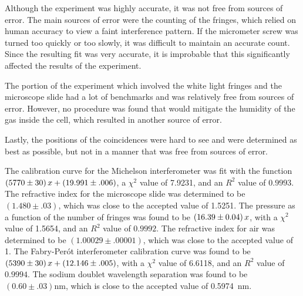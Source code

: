 \begin{paper}

	Although the experiment was highly accurate, it was not free from sources of error. The main sources of error were the counting of the fringes, which relied on human accuracy to view a faint interference pattern. If the micrometer screw was turned too quickly or too slowly, it was difficult to maintain an accurate count. Since the resulting fit was very accurate, it is improbable that this significantly affected the results of the experiment.
	
	The portion of the experiment which involved the white light fringes and the microscope slide had a lot of benchmarks and was relatively free from sources of error. However, no procedure was found that would mitigate the humidity of the gas inside the cell, which resulted in another source of error.
	
	Lastly, the positions of the coincidences were hard to see and were determined as best as possible, but not in a manner that was free from sources of error.
	
The calibration curve for the Michelson interferometer was fit with the function \( \left(5770 \pm 30 \right) x + \left(19.991 \pm .006\right) \), a $\chi^2$ value of 7.9231, and an \( R^2 \) value of \( 0.9993 \).
	The refractive index for the microscope slide was determined to be $(1.480\pm.03)$, which was close to the accepted value of 1.5251.
	The pressure as a function of the number of fringes was found to be \( \left(16.39 \pm 0.04\right) x \), with a $\chi^2$ value of 1.5654, and an \( R^2 \) value of \( 0.9992 \).
	The refractive index for air was determined to be $(1.00029\pm.00001)$, which was close to the accepted value of 1.
	The Fabry-Per\'ot interferometer calibration curve was found to be \( \left(5390 \pm 30\right) x + \left(12.146 \pm .005 \right) \), with a $\chi^2$ value of 6.6118, and an \( R^2 \) value of \( 0.9994 \).
	The sodium doublet wavelength separation was found to be $(0.60\pm.03)\si{\nano\meter}$, which is close to the accepted value of \SI{0.5974}{\nano\meter}.
	
	


\end{paper}
